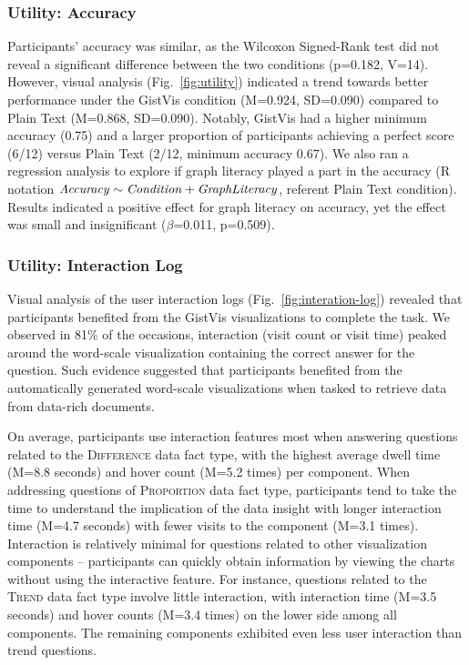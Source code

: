 \subsubsection{Utility: Accuracy}
Participants' accuracy was similar, as the Wilcoxon Signed-Rank test did not reveal a significant difference between the two conditions (p=0.182, V=14). However, visual analysis (Fig.~\ref{fig:utility}) indicated a trend towards better performance under the GistVis condition (M=0.924, SD=0.090) compared to Plain Text (M=0.868, SD=0.090). Notably, GistVis had a higher minimum accuracy (0.75) and a larger proportion of participants achieving a perfect score (6/12) versus Plain Text (2/12, minimum accuracy 0.67). We also ran a regression analysis to explore if graph literacy played a part in the accuracy (R notation $\text{\textit{Accuracy}} \sim \text{\textit{Condition}} + \text{\textit{GraphLiteracy}}$, referent Plain Text condition). Results indicated a positive effect for graph literacy on accuracy, yet the effect was small and insignificant ($\beta$=0.011, p=0.509).


\subsubsection{Utility: Interaction Log}
Visual analysis of the user interaction logs (Fig.~\ref{fig:interation-log}) revealed that participants benefited from the GistVis visualizations to complete the task. We observed in 81\% of the occasions, interaction (visit count or visit time) peaked around the word-scale visualization containing the correct answer for the question. Such evidence suggested that participants benefited from the automatically generated word-scale visualizations when tasked to retrieve data from data-rich documents.

On average, participants use interaction features most when answering questions related to the \textsc{Difference} data fact type, with the highest average dwell time (M=8.8 seconds) and hover count (M=5.2 times) per component. When addressing questions of \textsc{Proportion} data fact type, participants tend to take the time to understand the implication of the data insight with longer interaction time (M=4.7 seconds) with fewer visits to the component (M=3.1 times). Interaction is relatively minimal for questions related to other visualization components -- participants can quickly obtain information by viewing the charts without using the interactive feature. For instance, questions related to the \textsc{Trend} data fact type involve little interaction, with interaction time (M=3.5 seconds) and hover counts (M=3.4 times) on the lower side among all components. The remaining components exhibited even less user interaction than trend questions.

